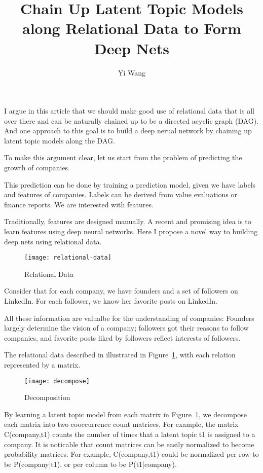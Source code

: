 \documentclass{article}
\begin{document}
\title{Chain Up Latent Topic Models along Relational Data to Form Deep
  Nets}
\author{Yi Wang}
\maketitle

I argue in this article that we should make good use of relational
data that is all over there and can be naturally chained up to be a
directed acyclic graph (DAG).  And one approach to this goal is to
build a deep nerual network by chaining up latent topic models along
the DAG.

To make this argument clear, let us start from the problem of
predicting the growth of companies.

This prediction can be done by training a prediction model, given we
have labels and features of companies.  Labels can be derived from
value evaluations or finance reports.  We are interested with
features.

Traditionally, features are designed manually.  A recent and promising
idea is to learn features using deep neural networks.  Here I propose
a novel way to building deep nets using relational data.

\begin{figure}
  \centering
  \texttt{[image: relational-data]}
  \caption{Relational Data}
  \label{fig:relational-data}
\end{figure}

Consider that for each company, we have founders and a set of
followers on LinkedIn.  For each follower, we know her favorite posts
on LinkedIn.

All these information are valualbe for the understanding of companies:
Founders largely determine the vision of a company; followers got
their reasons to follow companies, and favorite posts liked by followers
reflect interests of followers.

The relational data described in illustrated in
Figure~\ref{fig:relational-data}, with each relation represented by a
matrix.

\begin{figure}[t]
  \mbox{\hspace{-1cm}\texttt{[image: decompose]}}
  \caption{Decomposition}
  \label{fig:decompose}
\end{figure}

By learning a latent topic model from each matrix in
Figure~\ref{fig:relational-data}, we decompose each matrix into two
cooccurrence count matrices.  For example, the matrix C(company,t1)
counts the number of times that a latent topic t1 is assigned to a
company.  It is noticable that count matrices can be easily normalized
to become probability matrices.  For example, C(company,t1) could be
normalized per row to be P(company|t1), or per column to be
P(t1|company).
\end{document}

